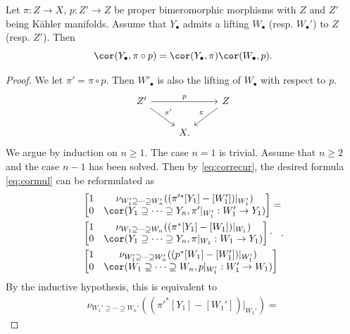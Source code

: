 \begin{proposition}\label{prop:cormult}
    Let $\pi\colon Z\rightarrow X$, $p\colon Z'\rightarrow Z$ be proper bimeromorphic morphisms with $Z$ and $Z'$ being Kähler manifolds.
    Assume that $Y_{\bullet}$ admits a lifting $W_{\bullet}$ (resp. $W_{\bullet}'$) to $Z$ (resp. $Z'$). Then
    \begin{equation}\label{eq:cormul}
    \cor(Y_{\bullet},\pi\circ p)=\cor(Y_{\bullet},\pi)\cor(W_{\bullet},p).
    \end{equation}
\end{proposition}
\begin{proof}
    We let $\pi'=\pi\circ p$.
    Then $W'_{\bullet}$ is also the lifting of $W_{\bullet}$ with respect to $p$.
    \[
    \begin{tikzcd}
Z' \arrow[rr, "p"] \arrow[rd, "\pi'"] &   & Z \arrow[ld, "\pi"'] \\
                                      & X. &
\end{tikzcd}
    \]
    We argue by induction on $n\geq 1$. The case $n=1$ is trivial. Assume that $n\geq 2$ and the case $n-1$ has been solved. Then by \eqref{eq:correcur}, the desired formula \eqref{eq:cormul} can be reformulated as
    \[
    \begin{aligned}
    &\begin{bmatrix}
    1 & \nu_{W_1'\supseteq \cdots \supseteq W_n'}((\pi'^*[Y_1]-[W_1'])|_{W_1'})\\
    0 & \cor(Y_1\supseteq \cdots \supseteq Y_n,\pi'|_{W_1'}:W_1'\rightarrow Y_1)
    \end{bmatrix}=\\
    &\begin{bmatrix}
    1 & \nu_{W_1\supseteq \cdots \supseteq W_n}((\pi^*[Y_1]-[W_1])|_{W_1})\\
    0 & \cor(Y_1\supseteq \cdots \supseteq Y_n,\pi|_{W_1}:W_1\rightarrow Y_1)
    \end{bmatrix}\cdot\\
    &\begin{bmatrix}
    1 & \nu_{W_1'\supseteq \cdots \supseteq W_n'}((p^*[W_1]-[W_1'])|_{W_1'})\\
    0 & \cor(W_1\supseteq \cdots \supseteq W_n,p|_{W_1'}:W_1'\rightarrow W_1)
    \end{bmatrix}
    \end{aligned}.
    \]
    By the inductive hypothesis, this is equivalent to
    \[
    \begin{split}
    \nu_{W_1'\supseteq \cdots \supseteq W_n'}\left((\pi'^*[Y_1]-[W_1'])|_{W_1'}\right)=

\end{split}\]
\end{proof}
